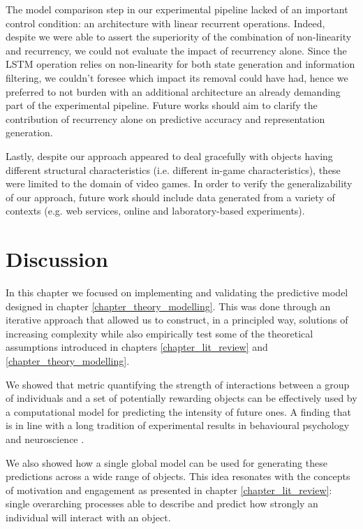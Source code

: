 The model comparison step in our experimental pipeline lacked of an important control condition: an architecture with linear recurrent operations. Indeed, despite we were able to assert the superiority of the combination of non-linearity and recurrency, we could not evaluate the impact of recurrency alone. Since the LSTM operation relies on non-linearity for both state generation and information filtering, we couldn't foresee which impact its removal could have had, hence we preferred to not burden with an additional architecture an already demanding part of the experimental pipeline. Future works should aim to clarify the contribution of recurrency alone on predictive accuracy and representation generation. 

Lastly, despite our approach appeared to deal gracefully  with objects having different structural characteristics (i.e. different in-game characteristics), these were limited to the domain of video games. In order to verify the generalizability of our approach, future work should include data generated from a variety of contexts (e.g. web services, online and laboratory-based experiments).

\section{Discussion}
\label{discussion_3}
In this chapter we focused on implementing and validating the predictive model designed in chapter \ref{chapter_theory_modelling}. This was done through an iterative approach that allowed us to construct, in a principled way, solutions of increasing complexity while also empirically test some of the theoretical assumptions introduced in chapters \ref{chapter_lit_review} and \ref{chapter_theory_modelling}. 

We showed that metric quantifying the strength of interactions between a group of individuals and a set of potentially rewarding objects can be effectively used by a computational model for predicting the intensity of future ones. A finding that is in line with a long tradition of experimental results in behavioural psychology \cite{thorndike1927law, skinner1953science} and neuroscience \cite{schultz1997neural, berridge2004motivation}. 

We also showed how a single global model can be used for generating these predictions across a wide range of objects. This idea resonates with the concepts of motivation and engagement as presented in chapter \ref{chapter_lit_review}: single overarching processes able to describe and predict how strongly an individual will interact with an object. 

